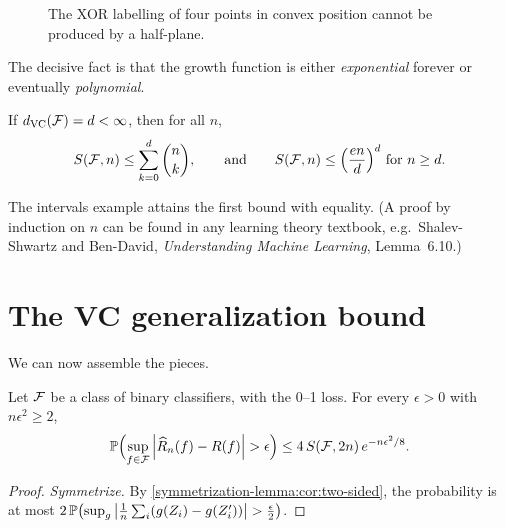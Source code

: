 \begin{notechapter}
\begin{figure}[ht]
\centering
{}
\caption{The XOR labelling of four points in convex position cannot be produced
by a half-plane.}
\label{symmetrization-lemma:fig:xor}
\end{figure}

The decisive fact is that the growth function is either \emph{exponential}
forever or eventually \emph{polynomial}.

\begin{lemma}\label{symmetrization-lemma:lem:sauer}
If $d_{\mathrm{VC}}(\mathcal{F}) = d < \infty$, then for all $n$,
\[
  S(\mathcal{F}, n) \leq \sum_{k=0}^d\binom nk, \qquad\text{and}\qquad S(\mathcal{F},n)\leq\Bigl(\frac{en}{d}\Bigr)^d \text{ for } n\geq d .
\]
\end{lemma}

The intervals example attains the first bound with equality. (A proof by
induction on $n$ can be found in any learning theory textbook, e.g.\
Shalev-Shwartz and Ben-David, \emph{Understanding Machine Learning}, Lemma~6.10.)

\section{The VC generalization bound}\label{symmetrization-lemma:sec:bound}

We can now assemble the pieces.

\begin{theorem}\label{symmetrization-lemma:thm:vc}
Let $\mathcal{F}$ be a class of binary classifiers, with the 0--1 loss. For every
$\epsilon>0$ with $n\epsilon^2\geq2$,
\[
  \mathbb{P}\Bigl(\sup_{f\in\mathcal{F}}\left|\widehat{R}_n(f) - R(f)\right| > \epsilon\Bigr)
  \leq 4\,S(\mathcal{F},2n)\,e^{-n\epsilon^2/8}.
\]
\end{theorem}

\begin{proof}
\emph{Symmetrize.} By \cref{symmetrization-lemma:cor:two-sided}, the
probability is at most
$2\,\mathbb{P}\bigl(\sup_g\left|\frac1n\sum_i(g(Z_i) - g(Z'_i))\right| > \frac\epsilon2\bigr)$.


\end{proof}
\end{notechapter}
